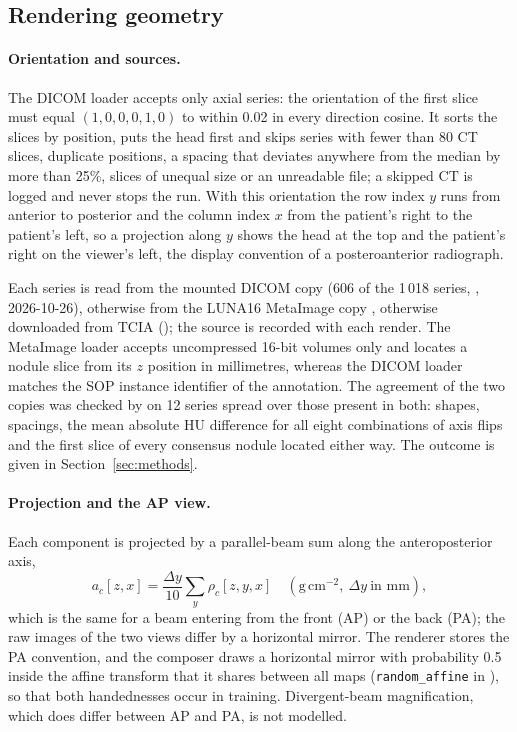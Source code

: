 \subsection{Rendering geometry}
\label{ssec:dp-geom}
\paragraph{Orientation and sources.} The DICOM loader accepts only axial series: the orientation of the first slice must equal $(1,0,0,0,1,0)$ to
within 0.02 in every direction cosine. It sorts the slices by position, puts the head first and skips series with fewer than 80 CT slices,
duplicate positions, a spacing that deviates anywhere from the median by more than 25\%, slices of unequal size or an unreadable file; a skipped
CT is logged and never stops the run. With this orientation the row index $y$ runs from anterior to posterior and the column index $x$ from the
patient's right to the patient's left, so a projection along $y$ shows the head at the top and the patient's right on the viewer's left, the
display convention of a posteroanterior radiograph.

Each series is read from the mounted DICOM copy (606 of the 1\,018 series, , 2026-10-26), otherwise from the LUNA16
MetaImage copy \citep{setio2017luna16}, otherwise downloaded from TCIA (); the source is recorded with
each render. The MetaImage loader accepts uncompressed 16-bit volumes only and locates a nodule slice from its $z$ position in millimetres, whereas
the DICOM loader matches the SOP instance identifier of the annotation. The agreement of the two copies was checked by
 on 12 series spread over those present in both: shapes, spacings, the mean absolute HU difference for all
eight combinations of axis flips and the first slice of every consensus nodule located either way. The outcome is given in
Section~\ref{sec:methods}.

\paragraph{Projection and the AP view.} Each component is projected by a parallel-beam sum along the anteroposterior axis,
\begin{equation}
  a_c[z,x]=\frac{\Delta y}{10}\sum_y\rho_c[z,y,x]\quad(\mathrm{g\,cm^{-2}},\ \Delta y\ \text{in mm}),
  \label{eq:dp-project}
\end{equation}
which is the same for a beam entering from the front (AP) or the back (PA); the raw images of the two views differ by a horizontal mirror. The
renderer stores the PA convention, and the composer draws a horizontal mirror with probability 0.5 inside the affine transform that it shares
between all maps (\texttt{random\_affine} in ), so that both handednesses occur in training. Divergent-beam magnification,
which does differ between AP and PA, is not modelled.

